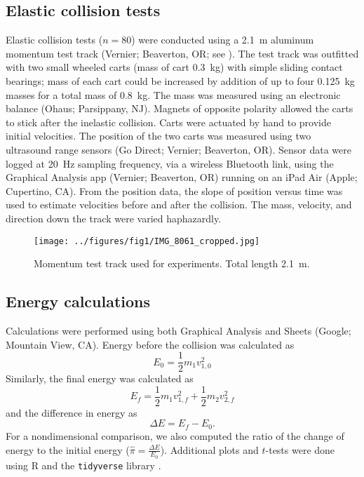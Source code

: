 \documentclass[aps,prl,preprint]{revtex4-1}
\begin{document}
\subsection{Elastic collision tests}
Elastic collision tests ($n=80$) were conducted using a \SI{2.1}{\meter} aluminum momentum test track (Vernier; Beaverton, OR; see ). The test track was outfitted with two small wheeled carts (mass of cart \SI{0.3}{\kilo\gram}) with simple sliding contact bearings; mass of each cart could be increased by addition of up to four \SI{0.125}{\kilo\gram} masses for a total mass of \SI{0.8}{\kilo\gram}. The mass was measured using an electronic balance (Ohaus; Parsippany, NJ).    Magnets of opposite polarity allowed the carts to stick after the inelastic collision. Carts were actuated by hand to provide initial velocities. The position of the two carts was measured using two ultrasound range sensors (Go Direct; Vernier; Beaverton, OR). Sensor data were logged at \SI{20}{\hertz} sampling frequency, via a wireless Bluetooth link, using the Graphical Analysis app (Vernier; Beaverton, OR) running on an iPad Air (Apple; Cupertino, CA). From the position data, the slope of position versus time was used to estimate velocities before and after the collision.  The mass, velocity, and direction down the track were varied haphazardly.   
\begin{figure}[h]
\begin{center}
\texttt{[image: ../figures/fig1/IMG\_8061\_cropped.jpg]}
\end{center}
\caption{Momentum test track used for experiments. Total length \SI{2.1}{\meter}. }
\label{fig:methods1}
\end{figure}

 \subsection{Energy calculations}
 Calculations were performed using both Graphical Analysis and Sheets (Google; Mountain View, CA). 
 Energy before the collision was calculated as
 \begin{equation}
E_0 = \frac{1}{2} m_1 v_{1,0}^2
 \end{equation}
Similarly, the final energy was calculated as
 \begin{equation}
E_f = \frac{1}{2} m_1 v_{1,f}^2 + \frac{1}{2} m_2 v_{2,f}^2
 \end{equation}
and the difference in energy as 
 \begin{equation}
\Delta E =  E_f - E_0. 
 \end{equation}
For a nondimensional comparison, we also computed the ratio of the change of energy to the initial energy ($\hat{\pi}=\frac{\Delta E}{E_0}$). Additional plots and $t$-tests were done using R \cite{r-2021} and the \lstinline{tidyverse} library \cite{wickham-2019-welcome}. 
\end{document}
